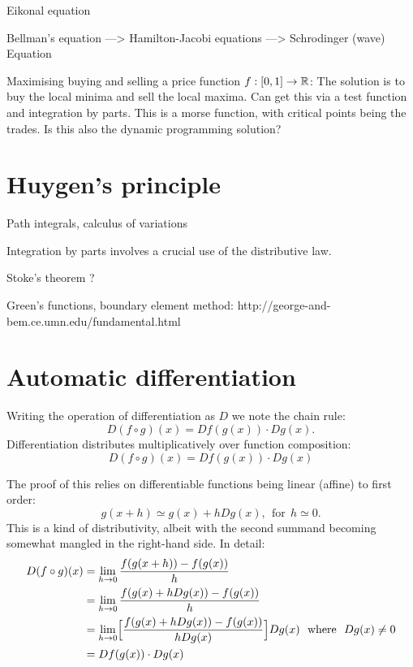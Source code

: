 \documentclass[11pt]{article}
\begin{document}
Eikonal equation

Bellman's equation ---> Hamilton-Jacobi equations ---> Schrodinger (wave) Equation


Maximising buying and selling a price function $f:[0,1]\to \mathbb R$:
    The solution is to buy the local minima and sell the
    local maxima. Can get this via a test function and
    integration by parts. This is a morse function, with
    critical points being the trades.
    Is this also the dynamic programming solution?

%
%

\section{Huygen's principle}

Path integrals, calculus of variations

Integration by parts involves a crucial use of the distributive law.

Stoke's theorem ? %

Green's functions,
boundary element method: http://george-and-bem.ce.umn.edu/fundamental.html


%
%

\section{Automatic differentiation}

Writing the operation of differentiation as $D$
we note the chain rule:
$$
    D(f\circ g)(x) = Df(g(x))\cdot Dg(x).
$$
Differentiation distributes
multiplicatively over function
composition:
$$
    D(f\circ g)(x) = Df(g(x))\cdot Dg(x)
$$

The proof of this relies on differentiable functions being linear (affine) to first order:
$$
    g(x+h) \simeq g(x) + hDg(x), \ \ \mbox{for}\ \ h \simeq 0.
$$
This is a kind of distributivity, albeit with the second summand becoming
somewhat mangled in the right-hand side.
In detail:
\begin{align*}
    D(f\circ g)(x)  &= \lim_{h\to 0} \frac{ f(g(x+h)) - f(g(x)) } {h}  \\
                    &= \lim_{h\to 0} \frac{ f(g(x) + hDg(x)) - f(g(x)) } {h}  \\
                    &= \lim_{h\to 0} \Bigl[\frac{ f(g(x) + hDg(x)) - f(g(x)) } {hDg(x)}\Bigr] Dg(x) \ \ \mbox{where}\ \  Dg(x)\ne 0\\
                    &= Df(g(x))\cdot Dg(x) \\
\end{align*}
\end{document}
